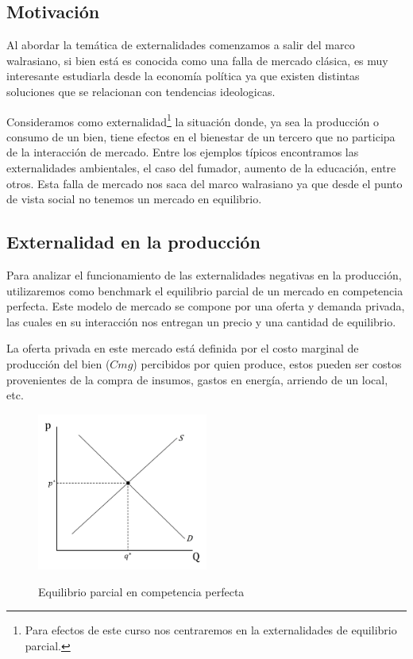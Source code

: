 \subsection{Motivación}
Al abordar la temática de externalidades comenzamos a salir del marco walrasiano, si bien está es conocida como una falla de mercado clásica, es muy interesante estudiarla desde la economía política ya que existen distintas soluciones que se relacionan con tendencias ideologicas.

Consideramos como externalidad\footnote{Para efectos de este curso nos centraremos en la externalidades de equilibrio parcial.} la situación donde, ya sea la producción o consumo de un bien, tiene efectos en el bienestar de un tercero que no participa de la interacción de mercado. Entre los ejemplos típicos encontramos las externalidades ambientales, el caso del fumador, aumento de la educación, entre otros. Esta falla de mercado nos saca del marco walrasiano ya que desde el punto de vista social no tenemos un mercado en equilibrio.

\subsection{Externalidad en la producción}

Para analizar el funcionamiento de las externalidades negativas en la producción, utilizaremos como benchmark el equilibrio parcial de un mercado en competencia perfecta. Este modelo de mercado se compone por una oferta y demanda privada, las cuales en su interacción nos entregan un precio y una cantidad de equilibrio.

La oferta privada en este mercado está definida por el costo marginal de producción del bien ($Cmg$) percibidos por quien produce, estos pueden ser costos provenientes de la compra de insumos, gastos en energía, arriendo de un local, etc. 

\begin{figure}[h]
    \centering
    \caption{Equilibrio parcial en competencia perfecta}
    \includegraphics[width=0.5\textwidth]{Figuras/Eq Parcial EXT.jpg}
    \label{fig:Eq parcial}
\end{figure}

